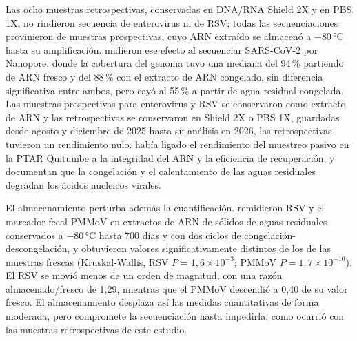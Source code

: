 Las ocho muestras retrospectivas, conservadas en DNA/RNA Shield 2X y en PBS 1X, no rindieron secuencia de enterovirus ni de RSV; todas las secuenciaciones provinieron de muestras prospectivas, cuyo ARN extraído se almacenó a $-80$\,°C hasta su amplificación.  midieron ese efecto al secuenciar SARS-CoV-2 por Nanopore, donde la cobertura del genoma tuvo una mediana del 94\,\% partiendo de ARN fresco y del 88\,\% con el extracto de ARN congelado, sin diferencia significativa entre ambos, pero cayó al 55\,\% a partir de agua residual congelada. Las muestras prospectivas para enterovirus y RSV se conservaron como extracto de ARN y las retrospectivas se conservaron en Shield 2X o PBS 1X, guardadas desde agosto y diciembre de 2025 hasta su análisis en 2026, las retrospectivas tuvieron un rendimiento nulo.  había ligado el rendimiento del muestreo pasivo en la PTAR Quitumbe a la integridad del ARN y la eficiencia de recuperación, y  documentan que la congelación y el calentamiento de las aguas residuales degradan los ácidos nucleicos virales.

El almacenamiento perturba además la cuantificación.  remidieron RSV y el marcador fecal PMMoV en extractos de ARN de sólidos de aguas residuales conservados a $-80$\,°C hasta 700 días y con dos ciclos de congelación-descongelación, y obtuvieron valores significativamente distintos de los de las muestras frescas (Kruskal-Wallis, RSV $P=1{,}6\times10^{-3}$; PMMoV $P=1{,}7\times10^{-10}$). El RSV se movió menos de un orden de magnitud, con una razón almacenado/fresco de 1,29, mientras que el PMMoV descendió a 0,40 de su valor fresco. El almacenamiento desplaza así las medidas cuantitativas de forma moderada, pero compromete la secuenciación hasta impedirla, como ocurrió con las muestras retrospectivas de este estudio.

